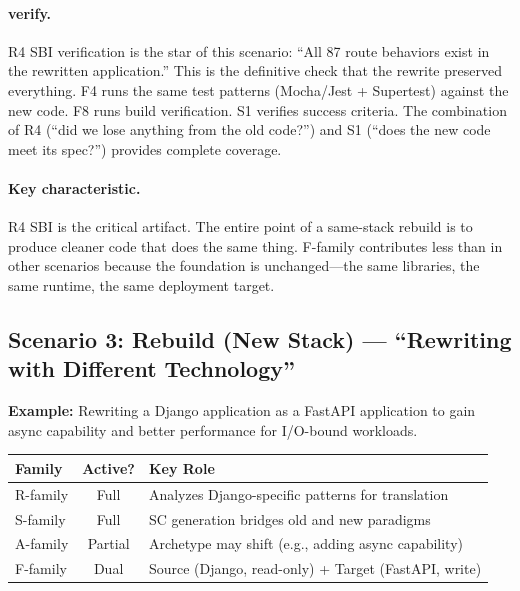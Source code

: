 \documentclass[11pt,a4paper,openright,twoside]{report}
\begin{document}
\paragraph{verify.}
R4 SBI verification is the star of this scenario: ``All 87 route behaviors exist in the rewritten application.'' This is the definitive check that the rewrite preserved everything. F4 runs the same test patterns (Mocha/Jest + Supertest) against the new code. F8 runs build verification. S1 verifies success criteria. The combination of R4 (``did we lose anything from the old code?'') and S1 (``does the new code meet its spec?'') provides complete coverage.

\paragraph{Key characteristic.}
R4 SBI is the critical artifact. The entire point of a same-stack rebuild is to produce cleaner code that does the same thing. F-family contributes less than in other scenarios because the foundation is unchanged---the same libraries, the same runtime, the same deployment target.

\subsection{Scenario 3: Rebuild (New Stack) --- ``Rewriting with Different Technology''}
\label{sec:scenario-rebuild-new}

\textbf{Example:} Rewriting a Django application as a FastAPI application to gain async capability and better performance for I/O-bound workloads.

\begin{center}
\begin{tabular}{lcp{8cm}}
\toprule
\textbf{Family} & \textbf{Active?} & \textbf{Key Role} \\
\midrule
R-family & Full & Analyzes Django-specific patterns for translation \\
S-family & Full & SC generation bridges old and new paradigms \\
A-family & Partial & Archetype may shift (e.g., adding async capability) \\
F-family & Dual & Source (Django, read-only) + Target (FastAPI, write) \\
\bottomrule
\end{tabular}
\end{center}
\end{document}
